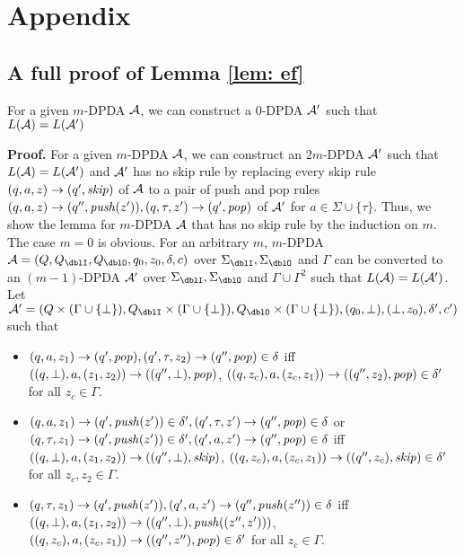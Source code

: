 \appendix
\section{Appendix}

\subsection{A full proof of Lemma \ref{lem: ef}}
\setcounter{lemma}{\ref{lem: ef}}
\addtocounter{lemma}{-1}
\begin{lemma}
For a given $m$-DPDA ${\cal A}$,
we can construct a $0$-DPDA ${\cal A}'$ such that
$L({\cal A})=L({\cal A}')$
\end{lemma}
{\bf Proof.}\quad
For a given $m$-DPDA ${\cal A}$,
we can construct an $2m$-DPDA ${\cal A}'$ such that
$L({\cal A})=L({\cal A}')$ and
${\cal A}'$ has no skip rule
by replacing every skip rule $(q,a,z)\to (q',\mathit{skip})$ of ${\cal A}$
to a pair of push and pop rules
$(q,a,z)\to(q'',\mathit{push}(z')), (q,\tau,z')\to(q',\mathit{pop})$ of ${\cal A}'$
for $a\in \Sigma\cup\{\tau\}$.
Thus, we show the lemma for $m$-DPDA ${\cal A}$ that has no skip rule
by the induction on $m$.
The case $m=0$ is obvious.
For an arbitrary $m$,
$m$-DPDA $\calA=(Q, Q_\dblI, Q_\dblO, q_0,z_0,\delta,c)$
over $\Sigma_\dblI, \Sigma_\dblO$ and $\Gamma$
can be converted to an
$(m-1)$-DPDA ${\cal A}'$
over $\Sigma_\dblI, \Sigma_\dblO$ and $\Gamma\cup\Gamma^2$
such that $L({\cal A})=L({\cal A}')$.
Let $\calA'=(Q\times(\Gamma\cup\{\bot\}), Q_\dblI\times(\Gamma\cup\{\bot\}), Q_\dblO\times(\Gamma\cup\{\bot\}), (q_0,\bot),(\bot,z_0),\delta',c')$
such that
\begin{itemize}
\item
$(q,a,z_1)\to (q',\mathit{pop}), (q',\tau,z_2)\to (q'',\mathit{pop})\in\delta$
iff
$((q,\bot),a,(z_1,z_2))\to ((q'',\bot),\mathit{pop})$,
$((q,z_c),a,(z_c,z_1))\to ((q'',z_2),\mathit{pop})\in\delta'$
for all $z_c\in\Gamma$.
\item
$(q,a,z_1)\to (q',\mathit{push}(z'))\in\delta', (q',\tau,z')\to (q'',\mathit{pop})\in\delta$
or
$(q,\tau,z_1)\to (q',\mathit{push}(z'))\in\delta', (q',a,z')\to (q'',\mathit{pop})\in\delta$
iff
$((q,\bot),a,(z_1,z_2))\to ((q'',\bot),\mathit{skip})$,
$((q,z_c),a,(z_c,z_1))\to ((q'',z_c),\mathit{skip})\in\delta'$
for all $z_c, z_2\in\Gamma$.
\item
$(q,\tau,z_1)\to (q',\mathit{push}(z')), (q',a,z')\to (q'',\mathit{push}(z''))\in\delta$
iff
$((q,\bot),a,(z_1,z_2))\to ((q'',\bot),\mathit{push}((z'',z')))$,
$((q,z_c),a,(z_c,z_1))\to ((q'',z''),\mathit{pop})\in\delta'$
for all $z_c\in\Gamma$.

\end{itemize}


